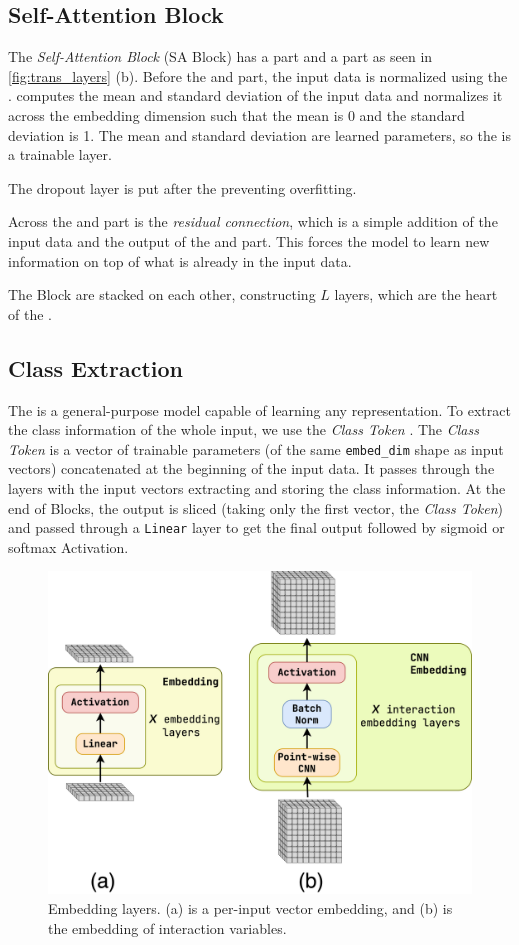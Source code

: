 \subsection{Self-Attention Block}
\label{sec:SA_block}
The \emph{Self-Attention Block} (SA Block) has a \MHSA part and a \FFN part as seen in \cref{fig:trans_layers} (b).
Before the \MHSA and \FFN part, the input data is normalized using the \LN. 
\LN computes the mean and standard deviation of the input data and normalizes it across the embedding dimension such that the mean is 0 and the standard deviation is 1.
The mean and standard deviation are learned parameters, so the \LN is a trainable layer.

The dropout layer is put after the \MHSA preventing overfitting.

Across the \MHSA and \FFN part is the \emph{residual connection}, which is a simple addition of the input data and the output of the \MHSA and \FFN part.
This forces the model to learn new information on top of what is already in the input data.

The \SA Block are stacked on each other, constructing $L$ layers, which are the heart of the \trans.

\subsection{Class Extraction}
\label{sec:class_extract}
The \trans is a general-purpose model capable of learning any representation.
To extract the class information of the whole input, we use the \emph{Class Token} \cite{bert}.
The \emph{Class Token} is a vector of trainable parameters (of the same \texttt{embed\_dim} shape as input vectors) concatenated at the beginning of the input data.
It passes through the \trans layers with the input vectors extracting and storing the class information.
At the end of \SA Blocks, the output is sliced (taking only the first vector, the \emph{Class Token}) and passed through a \texttt{Linear} layer to get the final output followed by sigmoid or softmax Activation.

\begin{figure}[htb]
    \centering
    \includegraphics[width=0.7\linewidth]{src/diagrams/embedding.png}
    \caption{Embedding layers. (a) is a per-input vector embedding, and (b) is the embedding of interaction variables.}
    \label{fig:embed}
\end{figure}
